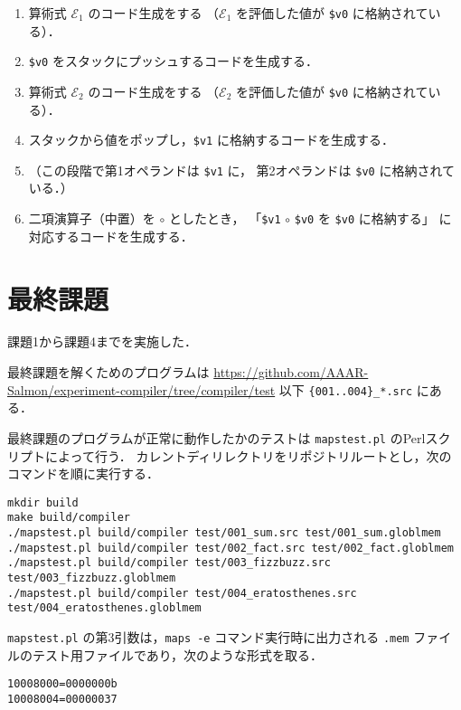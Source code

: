 \documentclass[lualatex, a4paper, ja=standard]{bxjsarticle}
\begin{document}
\begin{enumerate}
  \item 算術式 $\mathcal{E}_1$ のコード生成をする
  （$\mathcal{E}_1$ を評価した値が \verb|$v0| に格納されている）．
  \item \verb|$v0| をスタックにプッシュするコードを生成する．
  \item 算術式 $\mathcal{E}_2$ のコード生成をする
  （$\mathcal{E}_2$ を評価した値が \verb|$v0| に格納されている）．
  \item スタックから値をポップし，\verb|$v1| に格納するコードを生成する．
  \item （この段階で第1オペランドは \verb|$v1| に，
  第2オペランドは \verb|$v0| に格納されている．）
  \item 二項演算子（中置）を $\circ$ としたとき，
  「\verb|$v1| $\circ$ \verb|$v0| を \verb|$v0| に格納する」
  に対応するコードを生成する．
\end{enumerate}

\section{最終課題}

課題1から課題4までを実施した．

最終課題を解くためのプログラムは
\url{https://github.com/AAAR-Salmon/experiment-compiler/tree/compiler/test}
以下 \verb|{001..004}_*.src| にある．

最終課題のプログラムが正常に動作したかのテストは
\verb|mapstest.pl| のPerlスクリプトによって行う．
カレントディリレクトリをリポジトリルートとし，次のコマンドを順に実行する．
\begin{Verbatim}[frame=lines]
mkdir build
make build/compiler
./mapstest.pl build/compiler test/001_sum.src test/001_sum.globlmem
./mapstest.pl build/compiler test/002_fact.src test/002_fact.globlmem
./mapstest.pl build/compiler test/003_fizzbuzz.src test/003_fizzbuzz.globlmem
./mapstest.pl build/compiler test/004_eratosthenes.src test/004_eratosthenes.globlmem
\end{Verbatim}

\verb|mapstest.pl| の第3引数は，\verb|maps -e| コマンド実行時に出力される
\verb|.mem| ファイルのテスト用ファイルであり，次のような形式を取る．
\begin{Verbatim}[frame=lines, label=test/001_sum.globlmem]
10008000=0000000b
10008004=00000037
\end{Verbatim}
\end{document}
